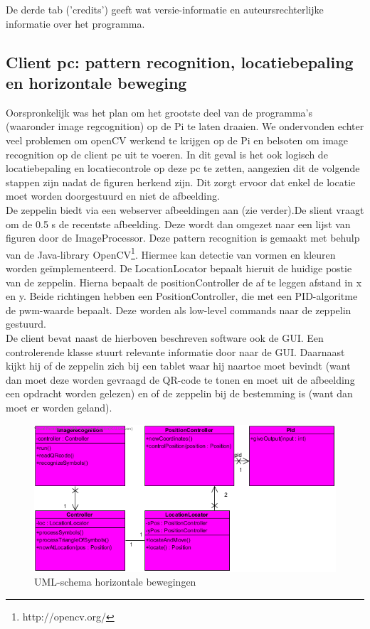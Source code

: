 \documentclass[eind]{penoverslag}
\begin{document}
De derde tab ('credits') geeft wat versie-informatie en auteursrechterlijke informatie over het programma.

\subsection{Client pc: pattern recognition, locatiebepaling en horizontale beweging}
 Oorspronkelijk was het plan om het grootste deel van de programma's (waaronder image regcognition) op de Pi te laten draaien. We ondervonden echter veel problemen om openCV werkend te krijgen op de Pi en belsoten om image recognition op de client pc uit te voeren. In dit geval is het ook logisch de locatiebepaling en locatiecontrole op deze pc te zetten, aangezien dit de volgende stappen zijn nadat de figuren herkend zijn. Dit zorgt ervoor dat enkel de locatie moet worden doorgestuurd en niet de afbeelding.\\

De zeppelin biedt via een webserver afbeeldingen aan (zie verder).De slient vraagt om de 0.5 s de recentste afbeelding. Deze wordt dan omgezet naar een lijst van figuren door de ImageProcessor. Deze pattern recognition is gemaakt met behulp van de Java-library OpenCV\footnote{http://opencv.org/}. Hiermee kan detectie van vormen en kleuren worden ge\"{i}mplementeerd. De LocationLocator bepaalt hieruit de huidige postie van de zeppelin. Hierna bepaalt de positionController de af te leggen afstand in x en y. Beide richtingen hebben een PositionController, die met een PID-algoritme de pwm-waarde bepaalt. Deze worden als low-level commands naar de zeppelin gestuurd.\\

De client bevat naast de hierboven beschreven software ook de GUI. Een controlerende klasse stuurt relevante informatie door naar de GUI. Daarnaast kijkt hij of de zeppelin zich bij een tablet waar hij naartoe moet bevindt (want dan moet deze worden gevraagd de QR-code te tonen en moet uit de afbeelding een opdracht worden gelezen) en of de zeppelin bij de bestemming is (want dan moet er worden geland).\\

\begin{figure}[H]
\begin{center}
\includegraphics[width=\textwidth]{classdiagrampeno.png}
\end{center}
\caption{UML-schema horizontale bewegingen}
\label{navigation}
\end{figure}
\end{document}
